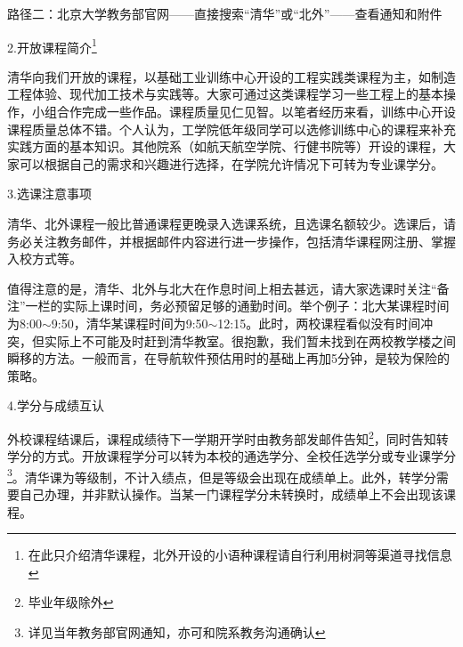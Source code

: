 \documentclass[11pt,oneside]{book}
\begin{document}
路径二：北京大学教务部官网——直接搜索“清华”或“北外”——查看通知和附件

\vspace{10pt}

2.开放课程简介\footnote{在此只介绍清华课程，北外开设的小语种课程请自行利用树洞等渠道寻找信息}

\vspace{10pt}

清华向我们开放的课程，以基础工业训练中心开设的工程实践类课程为主，如制造工程体验、现代加工技术与实践等。大家可通过这类课程学习一些工程上的基本操作，小组合作完成一些作品。课程质量见仁见智。以笔者经历来看，训练中心开设课程质量总体不错。个人认为，工学院低年级同学可以选修训练中心的课程来补充实践方面的基本知识。其他院系（如航天航空学院、行健书院等）开设的课程，大家可以根据自己的需求和兴趣进行选择，在学院允许情况下可转为专业课学分。

\vspace{10pt}

3.选课注意事项

\vspace{10pt}

清华、北外课程一般比普通课程更晚录入选课系统，且选课名额较少。选课后，请务必关注教务邮件，并根据邮件内容进行进一步操作，包括清华课程网注册、掌握入校方式等。

\vspace{10pt}

值得注意的是，清华、北外与北大在作息时间上相去甚远，请大家选课时关注“备注”一栏的实际上课时间，务必预留足够的通勤时间。举个例子：北大某课程时间为8:00$\sim$9:50，清华某课程时间为9:50$\sim$12:15。此时，两校课程看似没有时间冲突，但实际上不可能及时赶到清华教室。很抱歉，我们暂未找到在两校教学楼之间瞬移的方法。一般而言，在导航软件预估用时的基础上再加5分钟，是较为保险的策略。

\vspace{10pt}

4.学分与成绩互认

\vspace{10pt}

外校课程结课后，课程成绩待下一学期开学时由教务部发邮件告知\footnote{毕业年级除外}，同时告知转学分的方式。开放课程学分可以转为本校的通选学分、全校任选学分或专业课学分\footnote{详见当年教务部官网通知，亦可和院系教务沟通确认}。清华课为等级制，不计入绩点，但是等级会出现在成绩单上。此外，转学分需要自己办理，并非默认操作。当某一门课程学分未转换时，成绩单上不会出现该课程。

\vspace{10pt}
\end{document}
